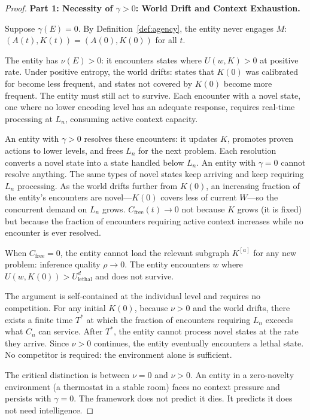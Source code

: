 \documentclass[11pt]{article}
\theoremstyle{definition}
\theoremstyle{remark}
\begin{document}
\begin{proof}

\textbf{Part 1: Necessity of $\gamma > 0$: World Drift and Context
Exhaustion.}

Suppose $\gamma(E) = 0$. By Definition~\ref{def:agency}, the entity never
engages $M$: $(A(t), K(t)) = (A(0), K(0))$ for all $t$.

The entity has $\nu(E) > 0$: it encounters states where $U(w, K) > 0$
at positive rate. Under positive entropy, the world drifts: states that
$K(0)$ was calibrated for become less frequent, and states not covered
by $K(0)$ become more frequent. The entity must still act to survive.
Each encounter with a novel state, one where no lower encoding level
has an adequate response, requires real-time processing at $L_n$,
consuming active context capacity.

An entity with $\gamma > 0$ resolves these encounters: it updates $K$,
promotes proven actions to lower levels, and frees $L_n$ for the next
problem. Each resolution converts a novel state into a state handled
below $L_n$. An entity with $\gamma = 0$ cannot resolve anything.
The same types of novel states keep arriving and keep requiring $L_n$
processing. As the world drifts further from $K(0)$, an increasing
fraction of the entity's encounters are novel---$K(0)$ covers less of
current $W$---so the concurrent demand on $L_n$ grows.
$C_{\mathrm{free}}(t) \to 0$ not because $K$ grows (it is fixed) but
because the fraction of encounters requiring active context increases
while no encounter is ever resolved.

When $C_{\mathrm{free}} = 0$, the entity cannot load the relevant
subgraph $K^{[a]}$ for any new problem: inference quality
$\rho \to 0$. The entity encounters $w$ where
$U(w, K(0)) > U_{\mathrm{lethal}}^d$ and does not survive.

The argument is self-contained at the individual level and requires no
competition. For any initial $K(0)$, because $\nu > 0$ and the world
drifts, there exists a finite time $T^*$ at which the fraction of
encounters requiring $L_n$ exceeds what $C_n$ can service. After $T^*$,
the entity cannot process novel states at the rate they arrive. Since
$\nu > 0$ continues, the entity eventually encounters a lethal state.
No competitor is required: the environment alone is sufficient.

The critical distinction is between $\nu = 0$ and $\nu > 0$. An entity
in a zero-novelty environment (a thermostat in a stable room) faces no
context pressure and persists with $\gamma = 0$. The framework does not
predict it dies. It predicts it does not need intelligence.


\end{proof}
\end{document}
